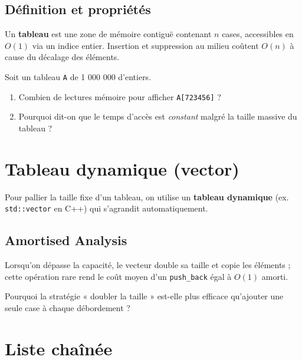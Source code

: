 \subsection{Définition et propriétés}
Un \textbf{tableau} est une zone de mémoire contiguë contenant $n$ cases,
accessibles en $O(1)$ via un indice entier.
Insertion et suppression au milieu coûtent $O(n)$ à cause du
décalage des éléments.

\begin{exercice}
Soit un tableau \lstinline|A| de 1 000 000 d’entiers.
\begin{enumerate}[label=\alph*)]
  \item Combien de lectures mémoire pour afficher \lstinline|A[723456]| ?
  \item Pourquoi dit-on que le temps d’accès est \emph{constant} malgré la
        taille massive du tableau ?
\end{enumerate}
\end{exercice}

\section{Tableau dynamique (vector)}

Pour pallier la taille fixe d’un tableau, on utilise un
\textbf{tableau dynamique} (ex. \lstinline|std::vector| en C++) qui s’agrandit
automatiquement.

\subsection{Amortised Analysis}
Lorsqu’on dépasse la capacité, le vecteur double sa taille et copie les
éléments ; cette opération rare rend le coût moyen d’un \lstinline|push_back|
égal à $O(1)$ amorti.

\begin{reflexion}
Pourquoi la stratégie « doubler la taille » est-elle plus
efficace qu’ajouter une seule case à chaque débordement ?
\end{reflexion}

\section{Liste chaînée}

